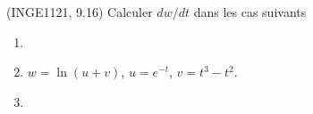 
\begin{exercice}\label{exoDerrivePartielle-0005}

	(INGE1121, 9.16) Calculer $dw/dt$ dans les cas suivants
	\begin{enumerate}

		\item
		\item
			$w=\ln(u+v)$, $u= e^{-t}$, $v=t^3-t^2$.
		\item

	\end{enumerate}

\end{exercice}
